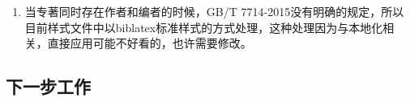 \begin{enumerate}






  \item 当专著同时存在作者和编者的时候，GB/T 7714-2015没有明确的规定，所以目前样式文件中以biblatex标准样式的方式处理，这种处理因为与本地化相关，直接应用可能不好看的，也许需要修改。

\end{enumerate}

\subsection{下一步工作}

